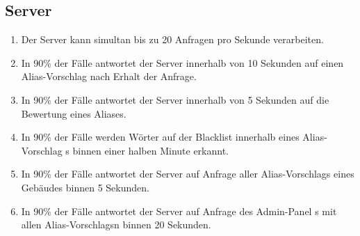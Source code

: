\subsection{Server}

\begin{enumerate}
    \item Der \Gls{Server} kann \gls{simultan} bis zu 20 Anfragen pro Sekunde verarbeiten.
    \item In 90\% der Fälle antwortet der \Gls{Server} innerhalb von 10 Sekunden auf einen \Gls{Alias-Vorschlag} nach Erhalt der Anfrage.
    \item In 90\% der Fälle antwortet der \Gls{Server} innerhalb von 5 Sekunden auf die Bewertung eines Aliases.
    \item In 90\% der Fälle werden Wörter auf der \Gls{Blacklist} innerhalb eines \Gls{Alias-Vorschlag} s binnen einer halben Minute erkannt.
    \item In 90\% der Fälle antwortet der \Gls{Server} auf Anfrage aller \Glspl{Alias-Vorschlag} eines Gebäudes binnen 5 Sekunden.
    \item In 90\% der Fälle antwortet der \Gls{Server} auf Anfrage des \Gls{Admin-Panel} s mit allen \Glspl{Alias-Vorschlag}n binnen 20 Sekunden.
\end{enumerate}